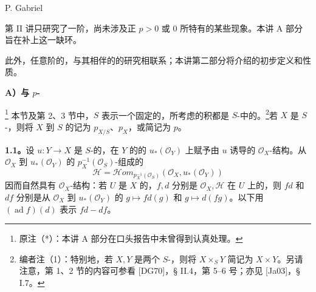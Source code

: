 \begin{center}P. Gabriel\end{center}
第 II 讲只研究了一阶，尚未涉及正 $p>0$ 或 $0$ 所特有的某些现象。本讲 A 部分旨在补上这一缺环。

此外，任意阶的，与其相伴的的研究相联系；本讲第二部分将介绍的初步定义和性质。

\begin{center}\textbf{A）与 $p$-}\end{center}
\footnote{原注（*）：本讲 A 部分在口头报告中未曾得到认真处理。}
本节及第 2、3 节中，$S$ 表示一个固定的，所考虑的积都是 $S$-中的。\footnote{编者注（1）：特别地，若 $X,Y$ 是两个 $S$-，则将 $X\times_S Y$ 简记为 $X\times Y$。另请注意，第 1、2 节的内容可参看 [DG70]，§ II.4，第 5–6 号；亦见 [Ja03]，§ I.7。}若 $X$ 是 $S$-，则将 $X$ 到 $S$ 的记为 $p_{X/S}$、$p_X$，或简记为 $p$。

\textbf{1.1。}设 $u:Y\to X$ 是 $S$-的，在 $Y$ 的的 $u_*(\mathcal O_Y)$ 上赋予由 $u$ 诱导的 $\mathcal O_X$-结构。从 $\mathcal O_X$ 到 $u_*(\mathcal O_Y)$ 的 $p_X^{-1}(\mathcal O_S)$-组成的
\[
\mathcal H=\mathcal Hom_{p_X^{-1}(\mathcal O_S)}(\mathcal O_X,u_*(\mathcal O_Y))
\]
因而自然具有 $\mathcal O_X$-结构：若 $U$ 是 $X$ 的，$f,d$ 分别是 $\mathcal O_X,\mathcal H$ 在 $U$ 上的，则 $fd$ 和 $df$ 分别是从 $\mathcal O_X$ 到 $u_*(\mathcal O_Y)$ 的 $g\mapsto f d(g)$ 和 $g\mapsto d(fg)$。以下用 $(\operatorname{ad}f)(d)$ 表示 $fd-df$。

